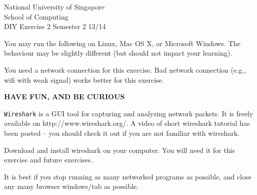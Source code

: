 \documentclass[a4paper,11pt]{exam}
\begin{document}
\extraheadheight{.5in}
%
{\large\sf National University of Singapore\\ School of Computing \\
\LARGE\sf DIY Exercise 2}%
{\large\sf Semester 2 13/14}
\firstpageheadrule
\pagestyle{headandfoot}

You may run the following on Linux, Mac OS X, or Microsoft Windows.  The behaviour may be slightly different (but should not impact your learning).

You need a network connection for this exercise.  Bad network connection (e.g., wifi with weak signal) works better for this exercise.

\begin{center}
	\textbf\textsf{HAVE FUN, AND BE CURIOUS}
\end{center}


\texttt{Wireshark} is a GUI tool for capturing and analyzing network packets.  It is freely available on http://www.wireshark.org/.  A video of short wireshark tutorial has been posted -- you should check it out if you are not familiar with wireshark.

Download and install wireshark on your computer.  You will need it for this exercise and future exercises.

It is best if you stop running as many networked programs as possible, and close any many browser windows/tab as possible.
\end{document}
